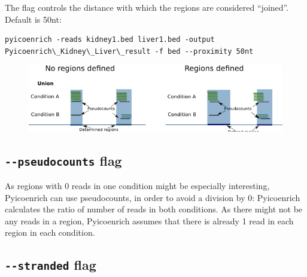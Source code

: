 \documentclass[letterpaper,10pt,english]{sphinxmanual}
\begin{document}
The flag  controls the distance with which the regions are considered ``joined''. Default is 50nt:

\begin{Verbatim}[commandchars=\\\{\}]
pyicoenrich -reads kidney1.bed liver1.bed -output Pyicoenrich\_Kidney\_Liver\_result -f bed --proximity 50nt
\end{Verbatim}
\begin{figure}[htbp]
\centering

\includegraphics{region_definition.png}
\end{figure}


\subsection{\texttt{-{-}pseudocounts} flag}
\label{pyicoenrich:pseudocounts-flag}
As regions with 0 reads in one condition might be especially interesting, Pyicoenrich can use pseudocounts, in order to avoid a division by 0: Pyicoenrich calculates the ratio of number of reads in both conditions. As there might not be any reads in a region, Pyicoenrich assumes that there is already 1 read in each region in each condition.


\subsection{\texttt{-{-}stranded} flag}
\label{pyicoenrich:stranded-flag}
\end{document}
